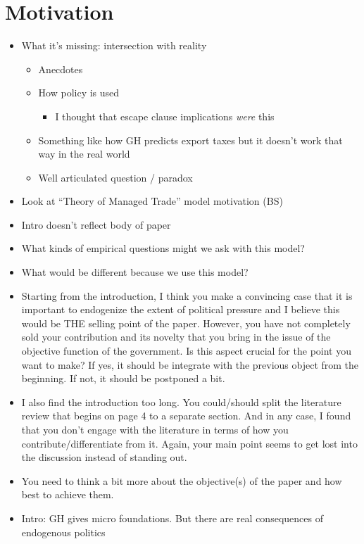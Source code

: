 \documentclass[12pt]{article}
\begin{document}
\section{Motivation}
		\begin{itemize}
			\item What it's missing: intersection with reality
				\begin{itemize}
					\item Anecdotes
					\item How policy is used
						\begin{itemize}
							\item I thought that escape clause implications \textit{were} this
						\end{itemize}
					\item Something like how GH predicts export taxes but it doesn't work that way in the real world
					\item Well articulated question / paradox
				\end{itemize}
			\item Look at ``Theory of Managed Trade'' model motivation (BS)
			\item Intro doesn't reflect body of paper
			\item What kinds of empirical questions might we ask with this model?
			\item What would be different because we use this model?
			\item Starting from the introduction, I think you make a convincing case that it is important to endogenize the extent of political pressure and I believe this would be THE selling point of the paper. However, you have not completely sold your contribution and its novelty that you bring in the issue of the objective function of the government. Is this aspect crucial for the point you want to make? If yes, it should be integrate with the previous object from the beginning. If not, it should be postponed a bit.
			\item I also find the introduction too long. You could/should split the literature review that begins on page 4 to a separate section. And in any case, I found that you don't engage with the literature in terms of how you contribute/differentiate from it. Again, your main point seems to get lost into the discussion instead of standing out.
			\item You need to think a bit more about the objective(s) of the paper and how best to achieve them.
			\item Intro: GH gives micro foundations. But there are real consequences of endogenous politics
		\end{itemize}
		
\end{document}
